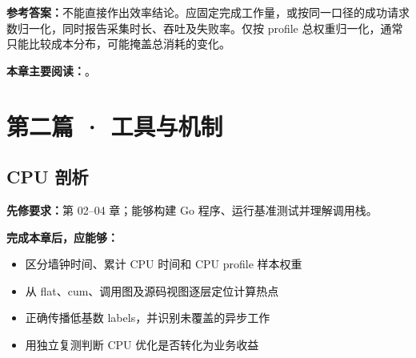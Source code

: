 \documentclass[UTF8,fontset=fandol,openany,11pt]{ctexbook}
\begin{document}
\noindent\textbf{参考答案：}不能直接作出效率结论。应固定完成工作量，或按同一口径的成功请求数归一化，同时报告采集时长、吞吐及失败率。仅按 profile 总权重归一化，通常只能比较成本分布，可能掩盖总消耗的变化。

\medskip\noindent\textbf{本章主要阅读：}\cite{go-proto}\cite{go-pprof}\cite{go-diagnostics}\cite{tools-pprof-cli}。
\part*{第二篇 · 工具与机制}
\chapter{CPU 剖析}
\label{ch:05}
\par\medskip
\noindent\textbf{先修要求：}第 02–04 章；能够构建 Go 程序、运行基准测试并理解调用栈。

\noindent\textbf{完成本章后，应能够：}
\begin{itemize}
\item 区分墙钟时间、累计 CPU 时间和 CPU profile 样本权重
\item 从 flat、cum、调用图及源码视图逐层定位计算热点
\item 正确传播低基数 labels，并识别未覆盖的异步工作
\item 用独立复测判断 CPU 优化是否转化为业务收益
\end{itemize}
\end{document}
